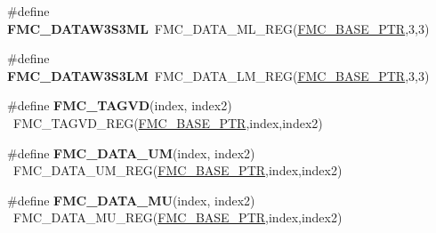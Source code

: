 \begin{DoxyCompactItemize}
\item 
\hypertarget{group___f_m_c___register___accessor___macros_ga4ded34886430cb8d8c26c04a6a4a9110}{}\#define {\bfseries F\+M\+C\+\_\+\+D\+A\+T\+A\+W3\+S3\+M\+L}~F\+M\+C\+\_\+\+D\+A\+T\+A\+\_\+\+M\+L\+\_\+\+R\+E\+G(\hyperlink{group___f_m_c___peripheral_ga0a740437b573e32e6b932bf729485fd9}{F\+M\+C\+\_\+\+B\+A\+S\+E\+\_\+\+P\+T\+R},3,3)\label{group___f_m_c___register___accessor___macros_ga4ded34886430cb8d8c26c04a6a4a9110}

\item 
\hypertarget{group___f_m_c___register___accessor___macros_gaabf75c36307e8573084e2bbdc618feb3}{}\#define {\bfseries F\+M\+C\+\_\+\+D\+A\+T\+A\+W3\+S3\+L\+M}~F\+M\+C\+\_\+\+D\+A\+T\+A\+\_\+\+L\+M\+\_\+\+R\+E\+G(\hyperlink{group___f_m_c___peripheral_ga0a740437b573e32e6b932bf729485fd9}{F\+M\+C\+\_\+\+B\+A\+S\+E\+\_\+\+P\+T\+R},3,3)\label{group___f_m_c___register___accessor___macros_gaabf75c36307e8573084e2bbdc618feb3}

\item 
\hypertarget{group___f_m_c___register___accessor___macros_ga26f85925aef70f6e17960b39e8cf4cbf}{}\#define {\bfseries F\+M\+C\+\_\+\+T\+A\+G\+V\+D}(index,  index2)                                ~F\+M\+C\+\_\+\+T\+A\+G\+V\+D\+\_\+\+R\+E\+G(\hyperlink{group___f_m_c___peripheral_ga0a740437b573e32e6b932bf729485fd9}{F\+M\+C\+\_\+\+B\+A\+S\+E\+\_\+\+P\+T\+R},index,index2)\label{group___f_m_c___register___accessor___macros_ga26f85925aef70f6e17960b39e8cf4cbf}

\item 
\hypertarget{group___f_m_c___register___accessor___macros_ga04afea47b87ffcae5fa9231f2e1f0e89}{}\#define {\bfseries F\+M\+C\+\_\+\+D\+A\+T\+A\+\_\+\+U\+M}(index,  index2)                            ~F\+M\+C\+\_\+\+D\+A\+T\+A\+\_\+\+U\+M\+\_\+\+R\+E\+G(\hyperlink{group___f_m_c___peripheral_ga0a740437b573e32e6b932bf729485fd9}{F\+M\+C\+\_\+\+B\+A\+S\+E\+\_\+\+P\+T\+R},index,index2)\label{group___f_m_c___register___accessor___macros_ga04afea47b87ffcae5fa9231f2e1f0e89}

\item 
\hypertarget{group___f_m_c___register___accessor___macros_gaab8e285a7b5dc9fe5a9a00b0c5a4c809}{}\#define {\bfseries F\+M\+C\+\_\+\+D\+A\+T\+A\+\_\+\+M\+U}(index,  index2)                            ~F\+M\+C\+\_\+\+D\+A\+T\+A\+\_\+\+M\+U\+\_\+\+R\+E\+G(\hyperlink{group___f_m_c___peripheral_ga0a740437b573e32e6b932bf729485fd9}{F\+M\+C\+\_\+\+B\+A\+S\+E\+\_\+\+P\+T\+R},index,index2)\label{group___f_m_c___register___accessor___macros_gaab8e285a7b5dc9fe5a9a00b0c5a4c809}


\end{DoxyCompactItemize}
